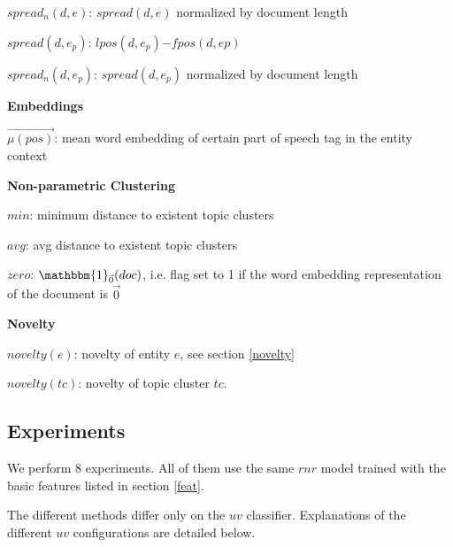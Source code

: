 \documentclass{article}
\begin{document}
\begin{itemize*}
\begin{itemize*}
\begin{itemize*}
            \item $spread_n(d,e)$: $spread(d,e)$ normalized by document length
            \item $spread(d,e_p)$: $lpos(d,e_p)\mathord{-}fpos(d,ep)$
            \item $spread_n(d,e_p)$: $spread(d,e_p)$ normalized by document length
        \end{itemize*}
    \end{itemize*}
  \item \textbf{Embeddings}
    \begin{itemize*}
        \item $\vec{\mu(pos)}$: mean word embedding of certain part of speech tag in the entity context
    \end{itemize*}
  \item \textbf{Non-parametric Clustering}
    \begin{itemize*}
        \item $min$: minimum distance to existent topic clusters
        \item $avg$: avg distance to existent topic clusters
        \item $zero$: $\mathbbm{1}_{\vec{0}}{(doc)}$, i.e. flag set to 1 if the word embedding representation of the document is $\vec{0}$
    \end{itemize*}
  \item \textbf{Novelty}
    \begin{itemize*}
        \item $novelty(e)$: novelty of entity $e$, see section \ref{novelty}
        \item $novelty(tc)$: novelty of topic cluster $tc$.
    \end{itemize*}
\end{itemize*}


\subsection{Experiments}

We perform 8 experiments. All of them use the same $rnr$ model trained with the basic features listed in section \ref{feat}.

The different methods differ only on the $uv$ classifier. Explanations of the different $uv$ configurations are detailed below.
\end{document}
